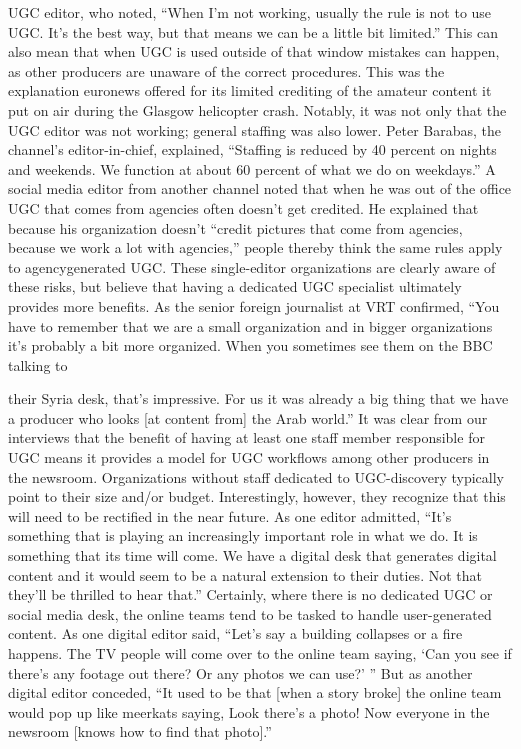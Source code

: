 \begin{enumerate}
UGC editor, who noted, ``When I'm not working, usually the rule is not to
use UGC. It's the best way, but that means we can be a little bit limited.''
This can also mean that when UGC is used outside of that window mistakes
can happen, as other producers are unaware of the correct procedures. This
was the explanation euronews offered for its limited crediting of the amateur
content it put on air during the Glasgow helicopter crash. Notably, it
was not only that the UGC editor was not working; general staffing was
also lower. Peter Barabas, the channel's editor-in-chief, explained, ``Staffing
is reduced by 40 percent on nights and weekends. We function at about 60
percent of what we do on weekdays.'' A social media editor from another
channel noted that when he was out of the office UGC that comes from
agencies often doesn't get credited. He explained that because his organization
doesn't ``credit pictures that come from agencies, because we work
a lot with agencies,'' people thereby think the same rules apply to agencygenerated
UGC.
These single-editor organizations are clearly aware of these risks, but believe
that having a dedicated UGC specialist ultimately provides more benefits.
As the senior foreign journalist at VRT confirmed, ``You have to remember
that we are a small organization and in bigger organizations it's probably a
bit more organized. When you sometimes see them on the BBC talking to

their Syria desk, that's impressive. For us it was already a big thing that we
have a producer who looks [at content from] the Arab world.'' It was clear
from our interviews that the benefit of having at least one staff member
responsible for UGC means it provides a model for UGC workflows among
other producers in the newsroom.
Organizations without staff dedicated to UGC-discovery typically point to
their size and/or budget. Interestingly, however, they recognize that this
will need to be rectified in the near future. As one editor admitted, ``It's
something that is playing an increasingly important role in what we do. It
is something that its time will come. We have a digital desk that generates
digital content and it would seem to be a natural extension to their duties.
Not that they'll be thrilled to hear that.''
Certainly, where there is no dedicated UGC or social media desk, the online
teams tend to be tasked to handle user-generated content. As one digital
editor said, ``Let's say a building collapses or a fire happens. The TV people
will come over to the online team saying, ‘Can you see if there's any footage
out there? Or any photos we can use?' '' But as another digital editor conceded,
``It used to be that [when a story broke] the online team would pop
up like meerkats saying, Look there's a photo! Now everyone in the newsroom
[knows how to find that photo].''

\end{enumerate}
